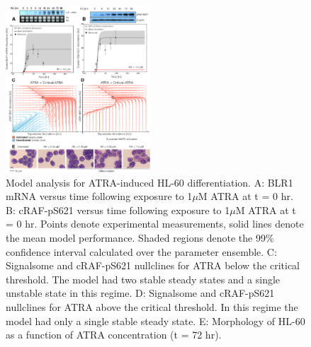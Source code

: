 \documentclass[10pt,twocolumn,twoside,final]{IEEEtran}
\begin{document}



\begin{figure}[!t]\centering
\includegraphics[width=0.48\textwidth]{./figs/Fig-2-cRAF-BLR1-Fit-Analysis.pdf}
\caption{Model analysis for ATRA-induced HL-60 differentiation.
A: BLR1 mRNA versus time following exposure to 1$\mu$M ATRA at t = 0 hr.
B: cRAF-pS621 versus time following exposure to 1$\mu$M ATRA at t = 0 hr.
Points denote experimental measurements, solid lines denote the mean model performance. Shaded regions denote the 99\% confidence interval calculated over the parameter ensemble.
C: Signalsome and cRAF-pS621 nullclines for ATRA below the critical threshold.
The model had two stable steady states and a single unstable state in this regime.
D: Signalsome and cRAF-pS621 nullclines for ATRA above the critical threshold.
In this regime the model had only a single stable steady state.
E: Morphology of HL-60 as a function of ATRA concentration (t = 72 hr). }\label{fig:model-fitting}
\end{figure}
\end{document}
